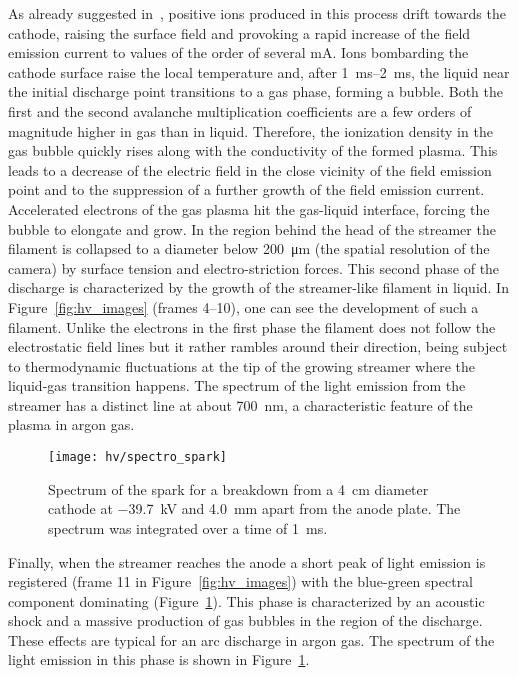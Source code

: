 As already suggested in~\cite{breakdown_14}, positive ions produced in this process drift towards the cathode, raising the surface field and provoking a rapid increase of the field emission current to values of the order of several \si{\milli\ampere}.
Ions bombarding the cathode surface raise the local temperature and, after \SIrange{1}{2}{\milli\second}, the liquid near the initial discharge point transitions to a gas phase, forming a bubble.
Both the first and the second avalanche multiplication coefficients are a few orders of magnitude higher in gas than in liquid.
Therefore, the ionization density in the gas bubble quickly rises along with the conductivity of the formed plasma.
This leads to a decrease of the electric field in the close vicinity of the field emission point and to the suppression of a further growth of the field emission current.
Accelerated electrons of the gas plasma hit the gas-liquid interface, forcing the bubble to elongate and grow.
In the region behind the head of the streamer the filament is collapsed to a diameter below \SI{200}{\micro\metre} (the spatial resolution of the camera) by surface tension and electro-striction forces.
This second phase of the discharge is characterized by the growth of the streamer-like filament in liquid.
In Figure~\ref{fig:hv_images} (frames \numrange{4}{10}), one can see the development of such a filament.
Unlike the electrons in the first phase the filament does not follow the electrostatic field lines but it rather rambles around their direction, being subject to thermodynamic fluctuations at the tip of the growing streamer where the liquid-gas transition happens.
The spectrum of the light emission from the streamer has a distinct line at about \SI{700}{\nano\metre}, a characteristic feature of the plasma in argon gas.

\begin{figure}[htb]
	\centering
	\texttt{[image: hv/spectro\_spark]}
	\caption{Spectrum of the spark for a breakdown from a \SI{4}{\centi\metre} diameter cathode at \SI{-39.7}{\kilo\volt} and \SI{4.0}{\milli\metre} apart from the anode plate. The spectrum was integrated over a time of \SI{1}{\milli\second}.}
	\label{fig:hv_spectro_spark}
\end{figure}

Finally, when the streamer reaches the anode a short peak of light emission is registered (frame \num{11} in Figure~\ref{fig:hv_images}) with the blue-green spectral component dominating (Figure~\ref{fig:hv_spectro_spark}).
This phase is characterized by an acoustic shock and a massive production of gas bubbles in the region of the discharge.
These effects are typical for an arc discharge in argon gas.
The spectrum of the light emission in this phase  is shown in Figure~\ref{fig:hv_spectro_spark}. 

